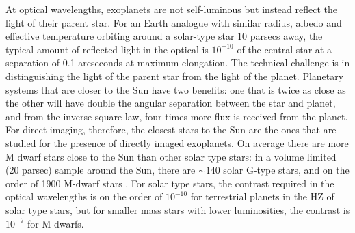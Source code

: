 \documentclass[letterpaper]{ar-1col}
\begin{document}
At optical wavelengths, exoplanets are not self-luminous but instead reflect the light of their parent star.
%
For an Earth analogue with similar radius, albedo and effective temperature orbiting around a solar-type star 10 parsecs away, the typical amount of reflected light in the optical is $10^{-10}$ of the central star at a separation of 0.1 arcseconds at maximum elongation.
%
The technical challenge is in distinguishing the light of the parent star from the light of the planet.
%
Planetary systems that are closer to the Sun have two benefits: one that is twice as close as the other will have double the angular separation between the star and planet, and from the inverse square law, four times more flux is received from the planet.
%
For direct imaging, therefore, the closest stars to the Sun are the ones that are studied for the presence of directly imaged exoplanets.
%
On average there are more M dwarf stars close to the Sun than other solar type stars: in a volume limited (20 parsec) sample around the Sun, there are $\sim 140$ solar G-type stars, and on the order of 1900 M-dwarf stars \citep{Kirkpatrick24}.
%
For solar type stars, the contrast required in the optical wavelengths is on the order of $10^{-10}$ for terrestrial planets in the HZ of solar type stars, but for smaller mass stars with lower luminosities, the contrast is $10^{-7}$ for M dwarfs.



\end{document}
